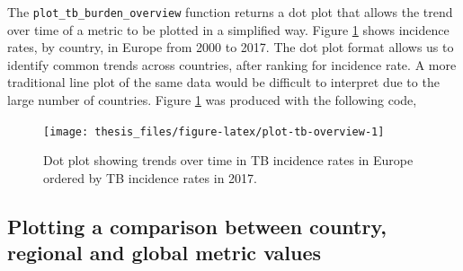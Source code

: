 \documentclass[11pt,twoside]{bristolthesis}
\begin{document}
  The \texttt{plot\_tb\_burden\_overview} function returns a dot plot that allows the trend over time of a metric to be plotted in a simplified way. Figure \ref{fig:plot-tb-overview} shows incidence rates, by country, in Europe from 2000 to 2017. The dot plot format allows us to identify common trends across countries, after ranking for incidence rate. A more traditional line plot of the same data would be difficult to interpret due to the large number of countries. Figure \ref{fig:plot-tb-overview} was produced with the following code,
  \begin{Shaded}
  \begin{Highlighting}[]
  \NormalTok{(} \NormalTok{,}
                           \NormalTok{,}
                           \NormalTok{,}
                           \NormalTok{,}
                           \NormalTok{) }\OperatorTok{+}
  \StringTok{  }\NormalTok{(} \NormalTok{(} \NormalTok{))}
  \end{Highlighting}
  \end{Shaded}
  \begin{figure}
  
  {\centering \texttt{[image: thesis\_files/figure-latex/plot-tb-overview-1]} 
  
  }
  
  \caption{Dot plot showing trends over time in TB incidence rates in Europe ordered by TB incidence rates in 2017. }\label{fig:plot-tb-overview}
  \end{figure}
  \hypertarget{gettbinr-plot-sum}{%
  \subsection{Plotting a comparison between country, regional and global metric values}\label{gettbinr-plot-sum}}
  
\end{document}
